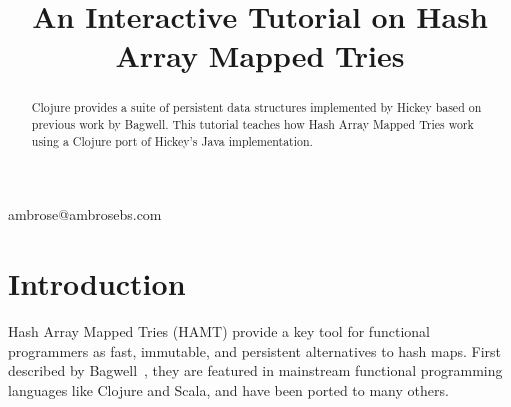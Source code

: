 \documentclass[preprint]{sigplanconf}
\begin{document}

%

           { ambrose@ambrosebs.com }


\title{An Interactive Tutorial on Hash Array Mapped Tries}

\maketitle

\begin{abstract}
Clojure provides a suite of persistent data structures
implemented by Hickey based on previous work by Bagwell.
This tutorial teaches
how Hash Array Mapped Tries work
using a Clojure port of
Hickey's Java implementation.
\end{abstract}


\section{Introduction}

Hash Array Mapped Tries (HAMT) provide a key tool for functional programmers
as fast, immutable, and persistent alternatives to hash maps.
First described by Bagwell~\cite{bagwell2001ideal},
they are featured in mainstream functional programming
languages like Clojure and Scala, and have been ported
to many others.
\end{document}
